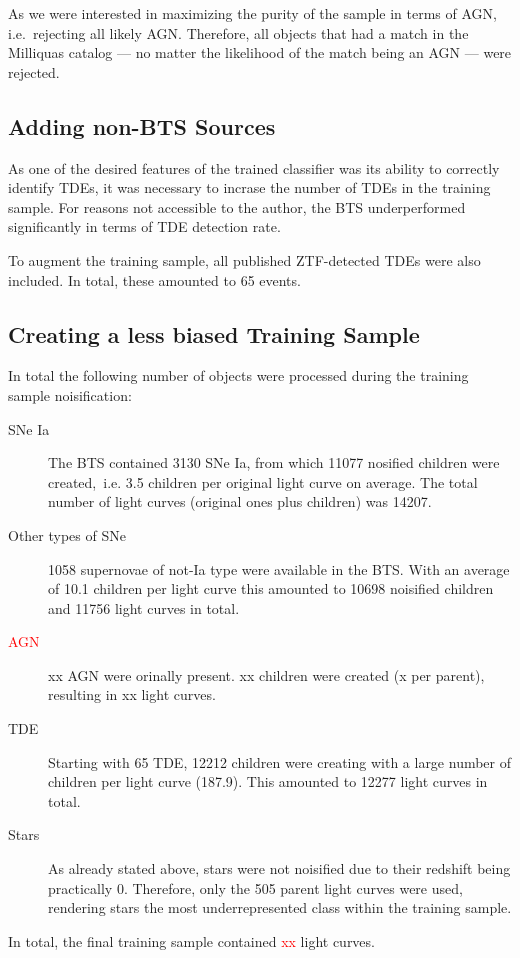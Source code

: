 As we were interested in maximizing the purity of the sample in terms of AGN, i.e.~rejecting all likely AGN. Therefore, all objects that had a match in the Milliquas catalog --- no matter the likelihood of the match being an AGN --- were rejected.

\subsection{Adding non-BTS Sources}\label{addsources}
As one of the desired features of the trained classifier was its ability to correctly identify TDEs, it was necessary to incrase the number of TDEs in the training sample. For reasons not accessible to the author, the BTS underperformed significantly in terms of TDE detection rate.

To augment the training sample, all published ZTF-detected TDEs were also included. In total, these amounted to 65 events.

\subsection{Creating a less biased Training Sample}
In total the following number of objects were processed during the training sample noisification:
\begin{description}
    \item[SNe Ia] The BTS contained 3130 SNe Ia, from which 11077 nosified children were created,~i.e. 3.5 children per original light curve on average. The total number of light curves (original ones plus children) was 14207.
    \item[Other types of SNe] 1058 supernovae of not-Ia type were available in the BTS. With an average of 10.1 children per light curve this amounted to 10698 noisified children and 11756 light curves in total.
    \item[\textcolor{red}{AGN}] xx AGN were orinally present. xx children were created (x per parent), resulting in xx light curves.
    \item[TDE] Starting with 65 TDE, 12212 children were creating with a large number of children per light curve (187.9). This amounted to 12277 light curves in total.
    \item[Stars] As already stated above, stars were not noisified due to their redshift being practically 0. Therefore, only the 505 parent light curves were used, rendering stars the most underrepresented class within the training sample.
\end{description}
In total, the final training sample contained \textcolor{red}{xx} light curves.

